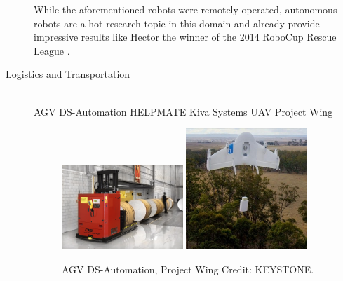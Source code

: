 \begin{description}
While the aforementioned robots were remotely operated, autonomous robots are a hot research topic in this domain and already provide impressive results like Hector the winner of the 2014 RoboCup Rescue League \cite{2014:hector_rescue_tdp}.

\item[Logistics and Transportation]\hfill \\
AGV DS-Automation
HELPMATE
Kiva Systems \cite{kiva}
UAV Project Wing
\begin{figure}[thpb]
	  \myfloatalign
      \footnotesize
      \centering
    \subfloat
    {  \label{fig:fig_agv}
        \includegraphics[width=0.45\textwidth,height=0.2\textheight]{figures/fig_AGV-dsautomation.jpg}
    }
    \subfloat
    {  \label{fig:fig_uav}
        \includegraphics[width=0.45\textwidth,height=0.2\textheight]{figures/fig_wing.jpg}
    }     
   \caption[Logistic robots]{AGV DS-Automation, Project Wing Credit: KEYSTONE.}
   \label{fig:fig_rescue}
\end{figure}



\end{description}
